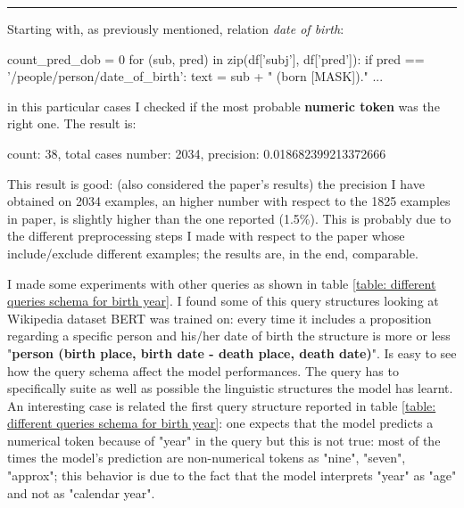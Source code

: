 \documentclass{article}
\begin{document}
\vspace{6pt}
\hrule
\vspace{6pt}
Starting with, as previously mentioned, relation \textit{date of birth}:
\begin{python}
count_pred_dob = 0
for (sub, pred) in zip(df['subj'], df['pred']):
  if pred == '/people/person/date_of_birth':
    text = sub + " (born [MASK])."
    ...
\end{python}
in this particular cases I checked if the most probable \textbf{numeric token} was the right one. The result is:
\begin{center}
count: 38, total cases number: 2034, precision: 0.018682399213372666
\end{center}
This result is good: (also considered the paper's results) the precision I have obtained on 2034 examples, an higher number with respect to the 1825 examples in paper, is slightly higher than the one reported (1.5\%). This is probably due to the different preprocessing steps I made with respect to the paper whose include/exclude different examples; the results are, in the end, comparable.

I made some experiments with other queries as shown in table \ref{table: different queries schema for birth year}. I found some of this query structures looking at Wikipedia dataset BERT was trained on: every time it includes a proposition regarding a specific person and his/her date of birth the structure is more or less "\textbf{person (birth place, birth date - death place, death date)}".
Is easy to see how the query schema affect the model performances. The query has to specifically suite as well as possible the linguistic structures the model has learnt. An interesting case is related the first query structure reported in table \ref{table: different queries schema for birth year}: one expects that the model predicts a numerical token because of "year" in the query but this is not true: most of the times the model's prediction are non-numerical tokens as "nine", "seven", "approx"; this behavior is due to the fact that the model interprets "year" as "age" and not as "calendar year".

\begin{table}[ht]
\caption{P@1 for different queries schemas}
\label{table: different queries schema for birth year}
\end{table}
\end{document}
